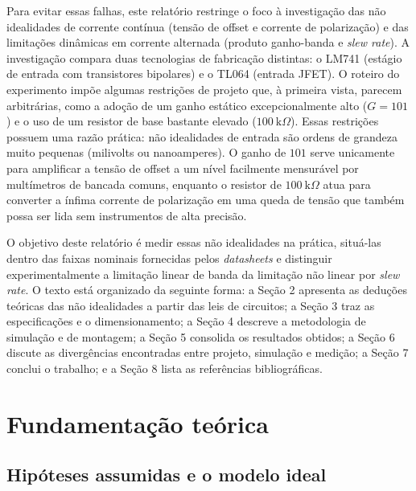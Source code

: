 \documentclass[11pt,a4paper]{article}
\begin{document}
Para evitar essas falhas, este relatório restringe o foco à investigação das não idealidades de corrente contínua (tensão de offset e corrente de polarização) e das limitações dinâmicas em corrente alternada (produto ganho-banda e \textit{slew rate}). A investigação compara duas tecnologias de fabricação distintas: o LM741 (estágio de entrada com transistores bipolares) e o TL064 (entrada JFET). O roteiro do experimento impõe algumas restrições de projeto que, à primeira vista, parecem arbitrárias, como a adoção de um ganho estático excepcionalmente alto ($G=101$) e o uso de um resistor de base bastante elevado ($100~\mathrm{k}\Omega$). Essas restrições possuem uma razão prática: não idealidades de entrada são ordens de grandeza muito pequenas (milivolts ou nanoamperes). O ganho de $101$ serve unicamente para amplificar a tensão de offset a um nível facilmente mensurável por multímetros de bancada comuns, enquanto o resistor de $100~\mathrm{k}\Omega$ atua para converter a ínfima corrente de polarização em uma queda de tensão que também possa ser lida sem instrumentos de alta precisão.

O objetivo deste relatório é medir essas não idealidades na prática, situá-las dentro das faixas nominais fornecidas pelos \textit{datasheets} e distinguir experimentalmente a limitação linear de banda da limitação não linear por \textit{slew rate}. O texto está organizado da seguinte forma: a Seção 2 apresenta as deduções teóricas das não idealidades a partir das leis de circuitos; a Seção 3 traz as especificações e o dimensionamento; a Seção 4 descreve a metodologia de simulação e de montagem; a Seção 5 consolida os resultados obtidos; a Seção 6 discute as divergências encontradas entre projeto, simulação e medição; a Seção 7 conclui o trabalho; e a Seção 8 lista as referências bibliográficas.

\section{Fundamentação teórica}

\subsection{Hipóteses assumidas e o modelo ideal}
\end{document}
